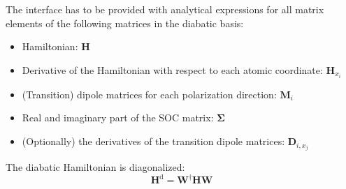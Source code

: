\documentclass[a4paper,11pt,DIV=15,openany,twoside=false]{scrbook}
\begin{document}
The interface has to be provided with analytical expressions for all matrix elements of the following matrices in the diabatic basis:
\begin{itemize}
  \item Hamiltonian: $\mathbf{H}$
  \item Derivative of the Hamiltonian with respect to each atomic coordinate: $\mathbf{H}_{x_i}$
  \item (Transition) dipole matrices for each polarization direction: $\mathbf{M}_i$
  \item Real and imaginary part of the SOC matrix: $\boldsymbol{\Sigma}$
  \item (Optionally) the derivatives of the transition dipole matrices: $\mathbf{D}_{i,x_j}$
\end{itemize}

The diabatic Hamiltonian is diagonalized:
\begin{equation}
  \mathbf{H}^{\text{d}}=\mathbf{W}^\dagger\mathbf{H}\mathbf{W}
\end{equation}
\end{document}

